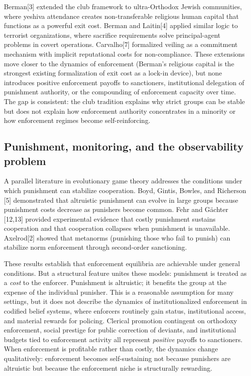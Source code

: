 \documentclass[12pt]{article}
\begin{document}
Berman[3] extended the club framework to ultra-Orthodox Jewish communities, where yeshiva attendance creates non-transferable religious human capital that functions as a powerful exit cost. Berman and Laitin[4] applied similar logic to terrorist organizations, where sacrifice requirements solve principal-agent problems in covert operations. Carvalho[7] formalized veiling as a commitment mechanism with implicit reputational costs for non-compliance. These extensions move closer to the dynamics of enforcement (Berman's religious capital is the strongest existing formalization of exit cost as a lock-in device), but none introduces positive enforcement payoffs to sanctioners, institutional delegation of punishment authority, or the compounding of enforcement capacity over time. The gap is consistent: the club tradition explains why strict groups can be stable but does not explain how enforcement authority concentrates in a minority or how enforcement regimes become self-reinforcing.

%
\subsection{Punishment, monitoring, and the observability problem}

A parallel literature in evolutionary game theory addresses the conditions under which punishment can stabilize cooperation. Boyd, Gintis, Bowles, and Richerson [5] demonstrated that altruistic punishment can evolve in large groups because punishment costs decrease as punishers become common. Fehr and Gächter [12,13] provided experimental evidence that costly punishment sustains cooperation and that cooperation collapses when punishment is unavailable. Axelrod[2] showed that metanorms (punishing those who fail to punish) can stabilize norm enforcement through second-order sanctioning.

These results establish that enforcement equilibria are achievable under general conditions. But a structural feature unites these models: punishment is treated as a \emph{cost} to the enforcer. Punishment is altruistic; it benefits the group at the expense of the individual punisher. This is a reasonable assumption for many settings, but it does not describe the dynamics of institutionalized enforcement in codified belief systems, where enforcers routinely gain status, institutional access, and material rewards for policing. Clerical promotion contingent on orthodoxy enforcement, social prestige for public correction of deviants, and institutional budgets tied to enforcement activity all represent \emph{positive} payoffs to sanctioners. When enforcement is profitable rather than costly, the dynamics change qualitatively: enforcement becomes self-sustaining not because punishers are altruistic but because the enforcement niche is structurally rewarding.
\end{document}
